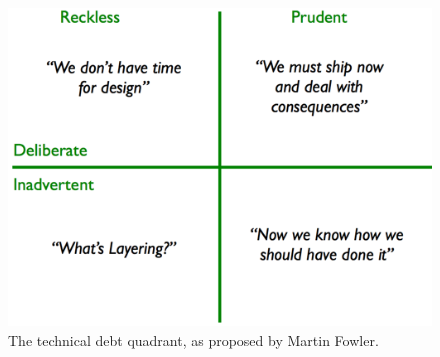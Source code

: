 \begin{figure}[!h]
	\centering
	\includegraphics[width=0.49\columnwidth]{images/introduction/technical_debt_quadrant}
	\caption{The technical debt quadrant, as proposed by Martin Fowler\cite{technicaldebtquadrant}.}
	\label{fig:technical-debt-quadrant}
\end{figure}

